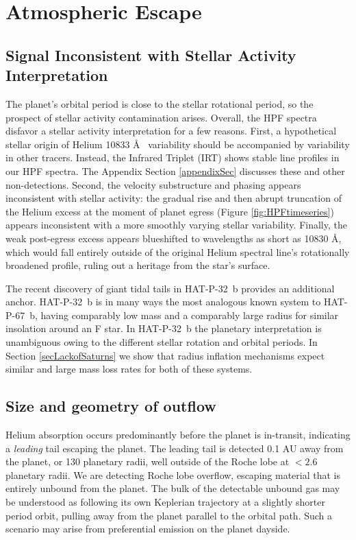 \documentclass[linenumbers, twocolumn, trackchanges]{aastex631}
\begin{document}
\section{Atmospheric Escape}\label{secResults}

\subsection{Signal Inconsistent with Stellar Activity Interpretation}
The planet's orbital period is close to the stellar rotational period, so the prospect of stellar activity contamination arises.  Overall, the HPF spectra disfavor a stellar activity interpretation for a few reasons.  First, a hypothetical stellar origin of Helium 10833 \AA~ variability should be accompanied by variability in other tracers.  Instead, the  Infrared Triplet (IRT) shows stable line profiles in our HPF spectra.  The Appendix Section \ref{appendixSec} discusses these and other non-detections.  Second, the velocity substructure and phasing appears inconsistent with stellar activity: the gradual rise and then abrupt truncation of the Helium excess at the moment of planet egress (Figure \ref{fig:HPFtimeseries}) appears inconsistent with a more smoothly varying stellar variability.  Finally, the weak post-egress excess appears blueshifted to wavelengths as short as 10830 \AA, which would fall entirely outside of the original Helium spectral line's rotationally broadened profile, ruling out a heritage from the star's surface.

The recent discovery of giant tidal tails in HAT-P-32~b \citep{doi:10.1126/sciadv.adf8736} provides an additional anchor.  HAT-P-32~b is in many ways the most analogous known system to HAT-P-67~b, having comparably low mass and a comparably large radius for similar insolation around an F star.  In HAT-P-32~b the planetary interpretation is unambiguous owing to the different stellar rotation and orbital periods.  In Section \ref{secLackofSaturns} we show that radius inflation mechanisms expect similar and large mass loss rates for both of these systems.


\subsection{Size and geometry of outflow}
Helium absorption occurs predominantly before the planet is in-transit, indicating a \emph{leading} tail escaping the planet.  The leading tail is detected 0.1 AU away from the planet, or 130 planetary radii, well outside of the Roche lobe at $<2.6$ planetary radii.  We are detecting Roche lobe overflow, escaping material that is entirely unbound from the planet.  The bulk of the detectable unbound gas may be understood as following its own Keplerian trajectory at a slightly shorter period orbit, pulling away from the planet parallel to the orbital path.  Such a scenario may arise from preferential emission on the planet dayside.
\end{document}
